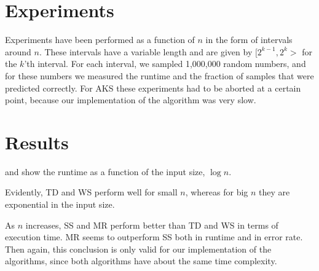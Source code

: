 
\section{Experiments}
\label{sec:experiments}

Experiments have been performed as a function of $n$ in the form of intervals around $n$.
These intervals have a variable length and are given by $[2^{k-1}, 2^k>$ for the $k$'th interval.
For each interval, we sampled 1,000,000 random numbers,
and for these numbers we measured the runtime and the fraction of samples that were predicted correctly.
For AKS these experiments had to be aborted at a certain point, because our implementation of the algorithm was very slow.

\section{Results}
\label{sec:results}

 and  show the runtime as a function of the input size, $\log n$.

Evidently, TD and WS perform well for small $n$, whereas for big $n$ they are exponential in the input size.

As $n$ increases, SS and MR perform better than TD and WS in terms of execution time.
MR seems to outperform SS both in runtime and in error rate.
Then again, this conclusion is only valid for our implementation of the algorithms, since both algorithms have about the same time complexity.



